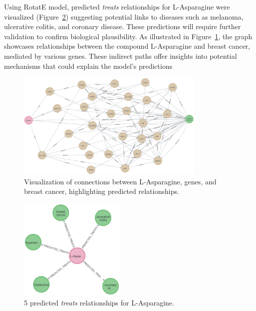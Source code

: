 Using RotatE model, predicted \textit{treats} relationships for L-Asparagine were visualized (Figure~\ref{fig:predicted_treats}) suggesting potential links to diseases such as melanoma, ulcerative colitis, and coronary disease. These predictions will require further validation to confirm biological plausibility. As illustrated in Figure~\ref{fig:kg_visualization}, the graph showcases relationships between the compound L-Asparagine and breast cancer, mediated by various genes. These indirect paths offer insights into potential mechanisms that could explain the model's predictions

\begin{figure}[ht]
    \centering
    \includegraphics[width=0.8\textwidth]{images/pykeen/results.png}
    \caption{Visualization of connections between L-Asparagine, genes, and breast cancer, highlighting predicted relationships.}
    \label{fig:kg_visualization}
\end{figure}

\begin{figure}[ht]
    \centering
    \includegraphics[width=0.45\textwidth]{images/pykeen/predicted treats.png}
    \caption{5 predicted \textit{treats} relationships for L-Asparagine.}
    \label{fig:predicted_treats}
\end{figure}


